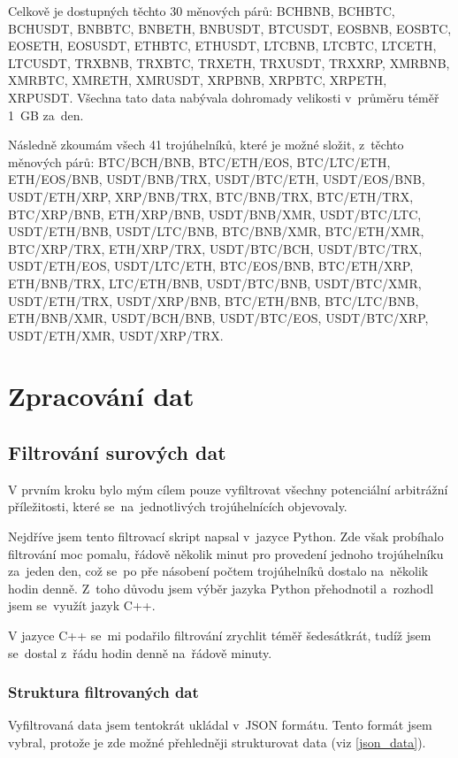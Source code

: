 \documentclass[thesis=B,czech]{FITthesis}[2019/03/21]
\begin{document}
Celkově je dostupných těchto 30 měnových párů: BCHBNB, BCHBTC, BCHUSDT, BNBBTC, BNBETH, BNBUSDT, BTCUSDT, EOSBNB,  \linebreak EOSBTC, EOSETH, EOSUSDT, ETHBTC, ETHUSDT, LTCBNB, LTCBTC, LTCETH, LTCUSDT, TRXBNB, TRXBTC, TRXETH, TRXUSDT,  \linebreak TRXXRP, XMRBNB, XMRBTC, XMRETH, XMRUSDT, XRPBNB,  \linebreak XRPBTC, XRPETH, XRPUSDT. Všechna tato data nabývala dohromady velikosti v~průměru téměř 1~GB za~den.

Následně zkoumám všech 41 trojúhelníků, které je možné složit, z~těchto měnových párů: BTC/BCH/BNB, BTC/ETH/EOS, BTC/LTC/ETH,  \linebreak ETH/EOS/BNB, USDT/BNB/TRX, USDT/BTC/ETH, USDT/EOS/BNB, USDT/ETH/XRP, XRP/BNB/TRX, BTC/BNB/TRX, BTC/ETH/TRX,  \linebreak BTC/XRP/BNB, ETH/XRP/BNB, USDT/BNB/XMR, USDT/BTC/LTC, USDT/ETH/BNB, USDT/LTC/BNB, BTC/BNB/XMR, BTC/ETH/XMR, BTC/XRP/TRX, ETH/XRP/TRX, USDT/BTC/BCH, USDT/BTC/TRX, USDT/ETH/EOS, USDT/LTC/ETH, BTC/EOS/BNB, BTC/ETH/XRP,  \linebreak ETH/BNB/TRX, LTC/ETH/BNB, USDT/BTC/BNB, USDT/BTC/XMR, USDT/ETH/TRX, USDT/XRP/BNB, BTC/ETH/BNB, BTC/LTC/BNB, ETH/BNB/XMR, USDT/BCH/BNB, USDT/BTC/EOS, USDT/BTC/XRP, USDT/ETH/XMR, USDT/XRP/TRX.

\section{Zpracování dat}
\subsection{Filtrování surových dat}
V prvním kroku bylo mým cílem pouze vyfiltrovat všechny potenciální arbitrážní příležitosti, které se~na~jednotlivých trojúhelnících objevovaly.

Nejdříve jsem tento filtrovací skript napsal v~jazyce Python. Zde však probíhalo filtrování moc pomalu, řádově několik minut pro provedení jednoho trojúhelníku za~jeden den, což se~po pře násobení počtem trojúhelníků dostalo na~několik hodin denně. Z~toho důvodu jsem výběr jazyka Python přehodnotil a~rozhodl jsem se~využít jazyk C++. 

V jazyce C++ se~mi podařilo filtrování zrychlit téměř šedesátkrát, tudíž jsem se~dostal z~řádu hodin denně na~řádově minuty.

\subsubsection{Struktura filtrovaných dat}
Vyfiltrovaná data jsem  tentokrát ukládal v~JSON formátu. Tento formát jsem vybral, protože je zde možné přehledněji strukturovat data (viz \ref{json_data}).
\end{document}
